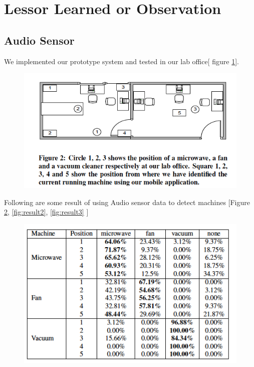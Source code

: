 \documentclass[11pt]{amsart}
\begin{document}
\section{Lessor Learned or Observation}

\subsection{Audio Sensor}

We implemented our prototype system and tested in our lab office[ figure \ref{fig:lablayout}].


\begin{figure}[htb]
\begin{center}
\includegraphics[width=1.0\linewidth, angle = 0]{lablayout.png}
\label{fig:lablayout}
\end{center}
\end{figure}

Following are some result of using Audio sensor data to detect machines [Figure \ref{fig:result1}, \ref{fig:result2}, \ref{fig:result3} ]
\begin{figure}[htb]
\begin{center}
\includegraphics[width=1.0\linewidth, angle = 0]{result1.png}
\label{fig:result1}
\end{center}
\end{figure}
\end{document}
